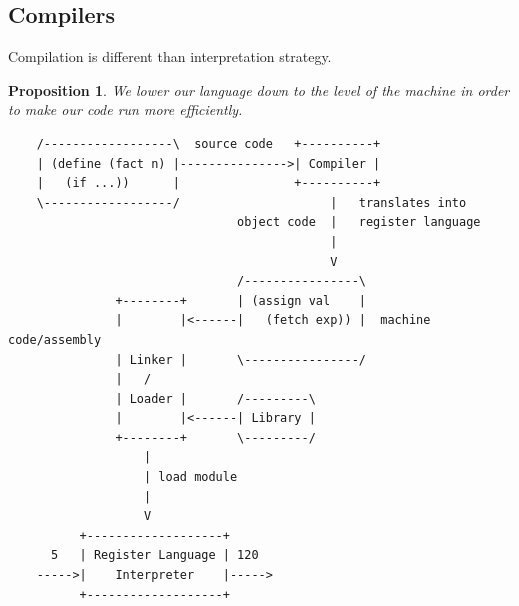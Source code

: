 \documentclass[a4paper,twoside]{article}
\newtheorem{proposition}[theorem]{Proposition}
\numberwithin{equation}{section}
\begin{document}
\subsection{Compilers}
Compilation is different than interpretation strategy.
\begin{proposition}
    We lower our language down to the level of the machine in order to make our code run more efficiently.
\end{proposition}
\begin{lstlisting}
    /------------------\  source code   +----------+
    | (define (fact n) |--------------->| Compiler |
    |   (if ...))      |                +----------+
    \------------------/                     |   translates into
                                object code  |   register language
                                             |
                                             V
                                /----------------\
               +--------+       | (assign val    |
               |        |<------|   (fetch exp)) |  machine code/assembly
               | Linker |       \----------------/
               |   /
               | Loader |       /---------\
               |        |<------| Library |
               +--------+       \---------/
                   |
                   | load module
                   |
                   V
          +-------------------+
      5   | Register Language | 120
    ----->|    Interpreter    |----->
          +-------------------+

\end{lstlisting}
\end{document}
